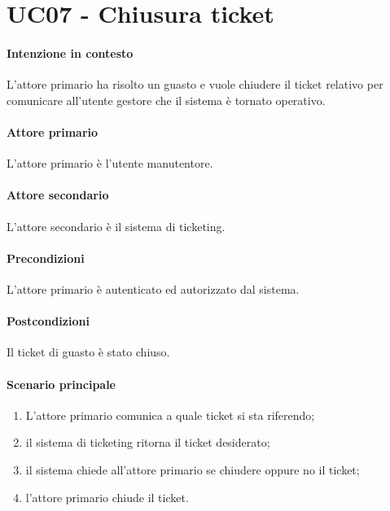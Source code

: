 \section{UC07 - Chiusura ticket}\label{uc:07}

\paragraph{Intenzione in contesto} L'attore primario ha risolto un guasto e vuole chiudere il ticket relativo per comunicare all'utente gestore che il sistema è tornato operativo.

\paragraph{Attore primario} L'attore primario è l'utente manutentore.
\paragraph{Attore secondario} L'attore secondario è il sistema di ticketing.

\paragraph{Precondizioni} L'attore primario è autenticato ed autorizzato dal sistema.

\paragraph{Postcondizioni} Il ticket di guasto è stato chiuso.

\paragraph{Scenario principale}

\begin{enumerate}
    \item L'attore primario comunica a quale ticket si sta riferendo;
    \item il sistema di ticketing ritorna il ticket desiderato;
    \item il sistema chiede all'attore primario se chiudere oppure no il ticket;
    \item l'attore primario chiude il ticket.
\end{enumerate}
